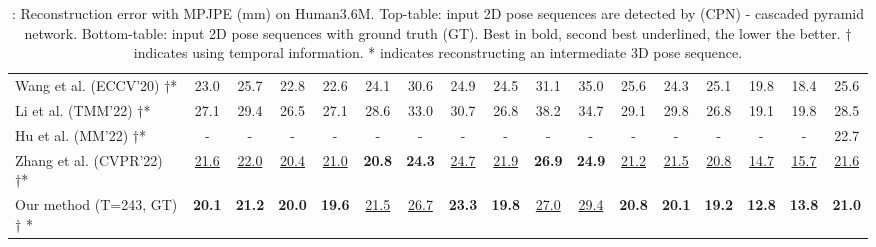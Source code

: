 \documentclass[10pt,twocolumn,letterpaper]{article}
\begin{document}
\begin{table*}[h]
{\begin{tabular}{lcccccccccccccccc}
\midrule

Wang et al. \cite{RN014} (ECCV’20) †*   &  23.0  &  25.7  &  22.8  &  22.6  &  24.1  &  30.6  &  24.9  &  24.5  &  31.1  &  35.0  &  25.6  &  24.3  &  25.1  &  19.8  &  18.4  &  25.6  \\
Li et al. \cite{li2022exploiting} (TMM’22) †*  &  27.1  &  29.4  &  26.5  &  27.1  &  28.6  &  33.0  &  30.7  &  26.8  &  38.2  &  34.7  &  29.1  &  29.8  &  26.8  &  19.1  &  19.8  &  28.5  \\
Hu et al. \cite{hu2021conditional} (MM’22) †*   &  -  &  -  &  -  &  -  &  -  &  -  &  -  &  -  &  -  &  -  &  -  &  -  &  -  &  -  &  -  &  22.7  \\ 
Zhang et al. \cite{zhang2022mixste} (CVPR’22) †*   &  \underline{21.6}  &  \underline{22.0}  &  \underline{20.4}  &  \underline{21.0}  &  \textbf{20.8}  &  \textbf{24.3}  &  \underline{24.7}  &  \underline{21.9}  &  \textbf{26.9}  &  \textbf{24.9}  &  \underline{21.2}  &  \underline{21.5}  &  \underline{20.8}  &  \underline{14.7}  &  \underline{15.7}  &  \underline{21.6}  \\
\rowcolor{grayrow}
Our method (T=243, GT) † * &  \textbf{20.1}  &  \textbf{21.2}  &  \textbf{20.0}  &  \textbf{19.6}  &  \underline{21.5}  &  \underline{26.7}  &  \textbf{23.3}  &  \textbf{19.8}  &  \underline{27.0}  &  \underline{29.4}  &  \textbf{20.8}  &  \textbf{20.1}  &  \textbf{19.2}  &  \textbf{12.8}  &  \textbf{13.8}  &  \textbf{21.0}  \\
    \bottomrule
  \end{tabular}}
   \caption{: Reconstruction error with MPJPE (mm) on Human3.6M. Top-table: input 2D pose sequences are detected by (CPN) - cascaded pyramid network. Bottom-table: input 2D pose sequences with ground truth (GT). Best in bold, second best underlined, the lower the better. † indicates using temporal information.  * indicates reconstructing an intermediate 3D pose sequence.}
  \label{compare2sota_p1}  
  \vspace{-5pt}
\end{table*}
\end{document}
